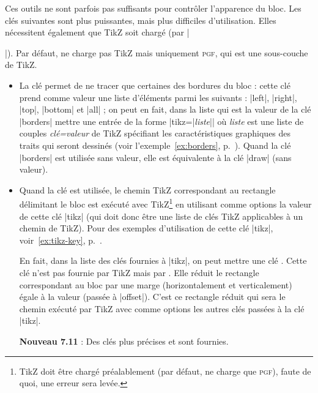 \documentclass[dvipsnames]{article}
\begin{document}
\medskip
Ces outils ne sont parfois pas suffisants pour contrôler l'apparence du bloc.
Les clés suivantes sont plus puissantes, mais plus difficiles d'utilisation.
Elles nécessitent également que TikZ soit chargé (par |\usepackage{tikz}|). Par
défaut,  ne charge pas TikZ mais uniquement \textsc{pgf}, qui
est une sous-couche de TikZ.
\begin{itemize}
\item {}
 La clé
 permet de ne tracer que certaines des bordures du bloc :
cette clé prend comme valeur une liste d'éléments parmi les suivants : |left|,
|right|, |top|, |bottom| et |all| ; on peut en fait, dans la liste qui est la
valeur de la clé |borders| mettre une entrée de la forme
|tikz={|\textsl{liste}|}| où \textsl{liste} est une liste de couples
\textsl{clé=valeur} de TikZ spécifiant les caractéristiques graphiques des
traits qui seront dessinés (voir l'exemple~\ref{ex:borders},
p.~\pageref{ex:borders}). Quand la clé |borders| est utilisée sans valeur, elle
est équivalente à la clé |draw| (sans valeur).

\item {}
Quand la clé  est utilisée, le chemin TikZ correspondant
au rectangle délimitant le bloc est exécuté avec TikZ\footnote{TikZ doit être
  chargé préalablement (par défaut,  ne charge que
  \textsc{pgf}), faute de quoi, une erreur sera levée.} en utilisant comme
options la valeur de cette clé |tikz| (qui doit donc être une liste de clés TikZ
applicables à un chemin de TikZ). Pour des exemples d'utilisation de cette clé
|tikz|, voir~\ref{ex:tikz-key}, p.~\pageref{ex:tikz-key}.

En fait, dans la liste des clés fournies à |tikz|, on peut mettre une clé
. Cette clé n'est pas fournie par TikZ mais par
. Elle réduit le rectangle correspondant au bloc par une marge
(horizontalement et verticalement) égale à la valeur (passée à |offset|). C'est
ce rectangle réduit qui sera le chemin exécuté par TikZ avec comme options les
autres clés passées à la clé |tikz|.

\smallskip
\colorbox{yellow!50}{\textbf{Nouveau 7.11}} : Des clés plus précises 
et  sont fournies.
\end{itemize}
\end{document}
